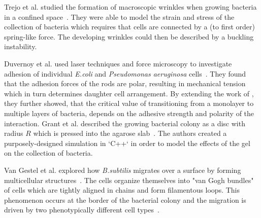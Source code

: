 \documentclass{article}
\begin{document}
Trejo et al. studied the formation of macroscopic wrinkles when growing bacteria in a confined
space~\cite{Trejo2013}.
They were able to model the strain and stress of the collection of bacteria which requires that
cells are connected by a (to first order) spring-like force.
The developing wrinkles could then be described by a buckling instability.

Duvernoy et al. used laser techniques and force microscopy to investigate adhesion of individual
\textit{E.coli} and \textit{Pseudomonas aeruginosa} cells~\cite{Duvernoy2018}.
They found that the adhesion forces of the rods are polar, resulting in mechanical tension which in
turn determines daughter cell arrangement.
By extending the work of \cite{Grant2014}, they further showed, that the critical value of
transitioning from a monolayer to multiple layers of bacteria, depends on the adhesive strength and
polarity of the interaction.
Grant et al. described the growing bacterial colony as a disc with radius $R$ which is pressed
into the agarose slab~\cite{Grant2014}.
The authors created a purposely-designed simulation in `C++` in order to model the effects of the
gel on the collection of bacteria.

Van Gestel et al. explored how \textit{B.subtilis} migrates over a surface by forming multicellular
structures~\cite{vanGestel2015}.
The cells organize themselves into "van Gogh bundles" of cells which are tightly aligned in chains
and form filamentous loops.
This phenomenon occurs at the border of the bacterial colony and the migration is driven by two
phenotypically different cell types~\cite{Lpez2010}.
\end{document}
